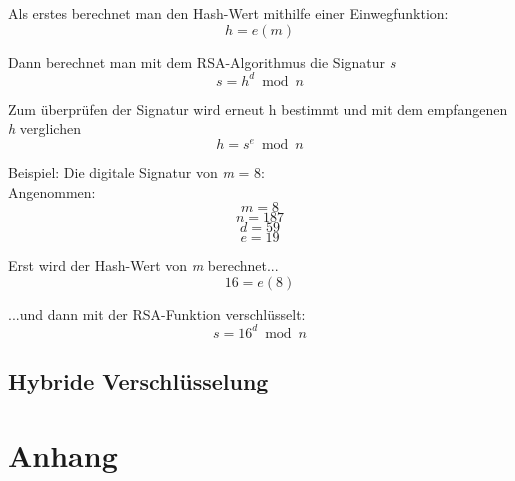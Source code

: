 \documentclass[14pt,a4paper]{scrartcl}
\begin{document}
Als erstes berechnet man den Hash-Wert mithilfe einer Einwegfunktion:
$$ {h = e(m)} $$

Dann berechnet man mit dem RSA-Algorithmus die Signatur \textit{s}
$$ {s = h^d \bmod n} $$

Zum überprüfen der Signatur wird erneut h bestimmt und mit dem empfangenen \textit{h} verglichen
$$ {h = s^e \bmod n} $$

Beispiel: Die digitale Signatur von \textit{m} = 8:\\ 

Angenommen:
$${ \textit{m} = 8 }$$
$${ \textit{n} = 187 }$$
$${ \textit{d} = 59 }$$
$${ \textit{e} = 19 }$$


Erst wird der Hash-Wert von \textit{m} berechnet...
$$ {16 = e(8)} $$	

...und dann mit der RSA-Funktion verschlüsselt: %
$$ {s = 16^d \bmod n} $$	

	 	
	\subsection{Hybride Verschlüsselung}

\pagebreak
\section{Anhang}

\listoffigures
\pagebreak

\nocite{*}
\printbibliography
\end{document}
